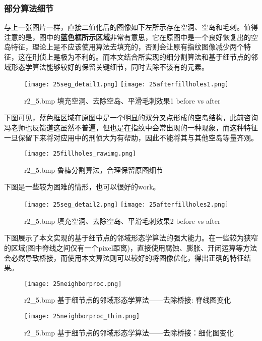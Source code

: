 \documentclass[UTF8]{ctexart}
\begin{document}
\subsubsection{部分算法细节}
与上一张图片一样，直接二值化后的图像如下左所示存在空洞、空岛和毛刺。值得注意的是，图中的\textbf{蓝色框所示区域}非常有意思，它在原图中是一个良好恢复出的空岛特征，理论上是不应该使用算法去填充的，否则会让原有指纹图像减少两个特征，这在刑侦上是极为不利的。而本文结合所实现的细分割算法和基于细节点的邻域形态学算法能够较好的保留关键细节，同时去除不该有的元素。
\begin{figure}[H]
    \centering
    \texttt{[image: 25seg\_detail1.png]}
    \texttt{[image: 25afterfillholes1.png]}
    \caption{r2\_5.bmp 填充空洞、去除空岛、平滑毛刺效果1 before vs after}
\end{figure}

下图可见，蓝色框区域在原图中是一个明显的双分叉点形成的空岛结构，此前咨询冯老师也反馈道这虽然不普遍，但也是在指纹中会常出现的一种现象，而这种特征一旦保留下来将对应用中的刑侦大为有帮助，因此不能将其与其他空岛等量齐观。
\begin{figure}[H]
    \centering
    \texttt{[image: 25fillholes\_rawimg.png]}
    \caption{r2\_5.bmp 鲁棒分割算法，合理保留原图细节}
\end{figure}

下图是一些较为困难的情形，也可以很好的work。
\begin{figure}[H]
    \centering
    \texttt{[image: 25seg\_detail2.png]}
    \texttt{[image: 25afterfillholes2.png]}
    \caption{r2\_5.bmp 填充空洞、去除空岛、平滑毛刺效果2 before vs after}
\end{figure}

下图展示了本文实现的基于细节点的邻域形态学算法的强大能力。在一些较为狭窄的区域(图中脊线之间仅有一个pixel距离)，直接使用腐蚀、膨胀、开闭运算等方法会必然导致桥接，而使用本文算法则可以较好的将图像优化，得出正确的特征结果。
\begin{figure}[H]
    \centering
    \texttt{[image: 25neighborproc.png]}
    \caption{r2\_5.bmp 基于细节点的邻域形态学算法——去除桥接: 脊线图变化}
\end{figure}

\begin{figure}[H]
    \centering
    \texttt{[image: 25neighborproc\_thin.png]}
    \caption{r2\_5.bmp 基于细节点的邻域形态学算法——去除桥接：细化图变化}
\end{figure}
\end{document}
